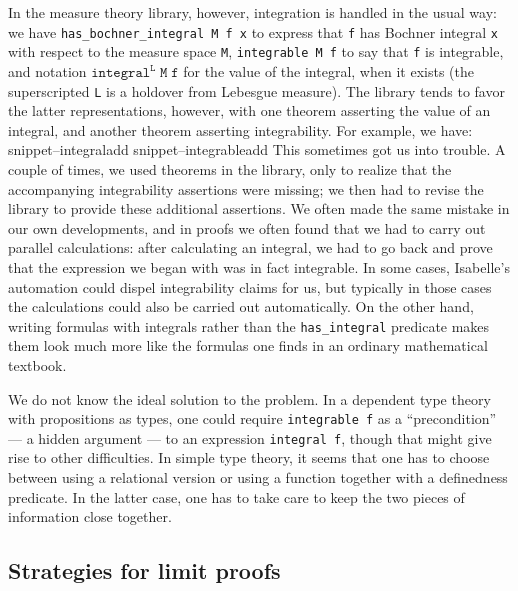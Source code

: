 \documentclass{svjour3}
\newcommand{\Snippet}[1]{\csname snippet--#1\endcsname}
\begin{document}
In the measure theory library, however, integration is handled in the usual way: we have \texttt{has\_bochner\_integral M f x} to express that \texttt{f} has Bochner integral \texttt{x} with respect to the measure space \texttt{M}, \texttt{integrable M f} to say that \texttt{f} is integrable, and notation $\mathtt{integral^L \; M \; f}$ for the value of the integral, when it exists (the superscripted \texttt{L} is a holdover from Lebesgue measure). The library tends to favor the latter representations, however, with one theorem asserting the value of an integral, and another theorem asserting integrability. For example, we have:
\Snippet{integraladd}
\Snippet{integrableadd}
This sometimes got us into trouble. A couple of times, we used theorems in the library, only to realize that the accompanying integrability assertions were missing; we then had to revise the library to provide these additional assertions. We often made the same mistake in our own developments, and in proofs we often found that we had to carry out parallel calculations: after calculating an integral, we had to go back and prove that the expression we began with was in fact integrable. In some cases, Isabelle's automation could dispel integrability claims for us, but typically in those cases the calculations could also be carried out automatically. On the other hand, writing formulas with integrals rather than the \texttt{has\_integral} predicate makes them look much more like the formulas one finds in an ordinary mathematical textbook.

We do not know the ideal solution to the problem. In a dependent type theory with propositions as types, one could require \texttt{integrable f} as a ``precondition'' --- a hidden argument --- to an expression \texttt{integral f}, though that might give rise to other difficulties. In simple type theory, it seems that one has to choose between using a relational version or using a function together with a definedness predicate. In the latter case, one has to take care to keep the two pieces of information close together.

\subsection{Strategies for limit proofs}
\end{document}
